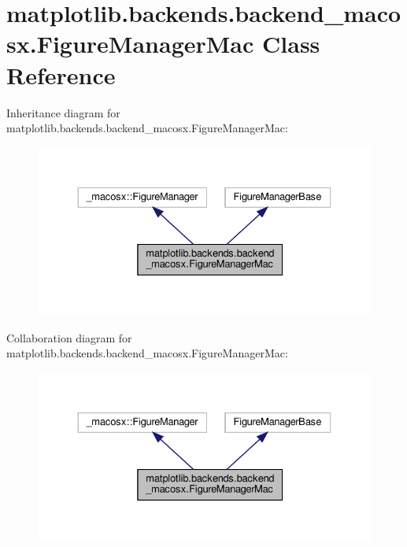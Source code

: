 \hypertarget{classmatplotlib_1_1backends_1_1backend__macosx_1_1FigureManagerMac}{}\section{matplotlib.\+backends.\+backend\+\_\+macosx.\+Figure\+Manager\+Mac Class Reference}
\label{classmatplotlib_1_1backends_1_1backend__macosx_1_1FigureManagerMac}


Inheritance diagram for matplotlib.\+backends.\+backend\+\_\+macosx.\+Figure\+Manager\+Mac\+:
\nopagebreak
\begin{figure}[H]
\begin{center}
\leavevmode
\includegraphics[width=330pt]{classmatplotlib_1_1backends_1_1backend__macosx_1_1FigureManagerMac__inherit__graph}
\end{center}
\end{figure}


Collaboration diagram for matplotlib.\+backends.\+backend\+\_\+macosx.\+Figure\+Manager\+Mac\+:
\nopagebreak
\begin{figure}[H]
\begin{center}
\leavevmode
\includegraphics[width=330pt]{classmatplotlib_1_1backends_1_1backend__macosx_1_1FigureManagerMac__coll__graph}
\end{center}
\end{figure}
